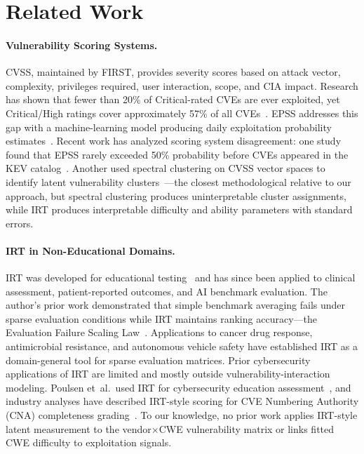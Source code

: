 \documentclass[11pt,a4paper]{article}
\begin{document}
\section{Related Work}

\paragraph{Vulnerability Scoring Systems.}
CVSS, maintained by FIRST, provides severity scores based on attack vector, complexity, privileges required, user interaction, scope, and CIA impact.
Research has shown that fewer than 20\% of Critical-rated CVEs are ever exploited, yet Critical/High ratings cover approximately 57\% of all CVEs~\citep{allodi2014}.
EPSS addresses this gap with a machine-learning model producing daily exploitation probability estimates~\citep{jacobs2021epss}.
Recent work has analyzed scoring system disagreement: one study found that EPSS rarely exceeded 50\% probability before CVEs appeared in the KEV catalog~\citep{conflicting2025}.
Another used spectral clustering on CVSS vector spaces to identify latent vulnerability clusters~\citep{suciu2017latent}---the closest methodological relative to our approach, but spectral clustering produces uninterpretable cluster assignments, while IRT produces interpretable difficulty and ability parameters with standard errors.

\paragraph{IRT in Non-Educational Domains.}
IRT was developed for educational testing~\citep{lord1968} and has since been applied to clinical assessment, patient-reported outcomes, and AI benchmark evaluation.
The author's prior work demonstrated that simple benchmark averaging fails under sparse evaluation conditions while IRT maintains ranking accuracy---the Evaluation Failure Scaling Law~\citep{kang2026efsl}.
Applications to cancer drug response, antimicrobial resistance, and autonomous vehicle safety have established IRT as a domain-general tool for sparse evaluation matrices.
Prior cybersecurity applications of IRT are limited and mostly outside vulnerability-interaction modeling.
Poulsen et~al.\ used IRT for cybersecurity education assessment~\citep{poulsen2021cci}, and industry analyses have described IRT-style scoring for CVE Numbering Authority (CNA) completeness grading~\citep{bitsight2024}.
To our knowledge, no prior work applies IRT-style latent measurement to the vendor$\times$CWE vulnerability matrix or links fitted CWE difficulty to exploitation signals.
\end{document}
